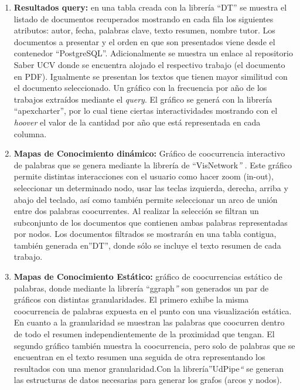 \documentclass[
  12pt,
  openany]{book}
\begin{document}
\begin{enumerate}
\begin{enumerate}
    \begin{enumerate}
    \def\labelenumiii{\arabic{enumiii}.}
    \item
      \textbf{Resultados query:} en una tabla creada con la librería ``DT'' se muestra el listado de documentos recuperados mostrando en cada fila los siguientes atributos: autor, fecha, palabras clave, texto resumen, nombre tutor. Los documentos a presentar y el orden en que son presentados viene desde el contenedor ``PostgreSQL''. Adicionalmente se muestra un enlace al repositorio Saber UCV donde se encuentra alojado el respectivo trabajo (el documento en PDF). Igualmente se presentan los textos que tienen mayor similitud con el documento seleccionado. Un gráfico con la frecuencia por año de los trabajos extraídos mediante el \emph{query}. El gráfico se generá con la librería ``apexcharter'', por lo cual tiene ciertas interactividades mostrando con el \emph{hoover} el valor de la cantidad por año que está representada en cada columna.
    \item
      \textbf{Mapas de Conocimiento dinámico:} Gráfico de coocurrencia interactivo de palabras que se genera mediante la librería de ``VisNetwork\emph{''} . Este gráfico permite distintas interacciones con el usuario como hacer zoom (in-out), seleccionar un determinado nodo, usar las teclas izquierda, derecha, arriba y abajo del teclado, así como también permite seleccionar un arco de unión entre dos palabras coocurrentes. Al realizar la selección se filtran un subconjunto de los documentos que contienen ambas palabras representadas por nodos. Los documentos filtrados se mostrarán en una tabla contigua, también generada en''DT'', donde sólo se incluye el texto resumen de cada trabajo.
    \item
      \textbf{Mapas de Conocimiento Estático:} gráfico de coocurrencias estático de palabras, donde mediante la librería ``ggraph\emph{''} son generados un par de gráficos con distintas granularidades. El primero exhibe la misma coocurrencia de palabras expuesta en el punto con una visualización estática. En cuanto a la granularidad se muestran las palabras que coocurren dentro de todo el resumen independientemente de la proximidad que tengan. El segundo gráfico también muestra la coocurrencia, pero solo de palabras que se encuentran en el texto resumen una seguida de otra representando los resultados con una menor granularidad.Con la librería''UdPipe\emph{``} se generan las estructuras de datos necesarias para generar los grafos (arcos y nodos).


\end{enumerate}
\end{enumerate}
\end{enumerate}
\end{document}
